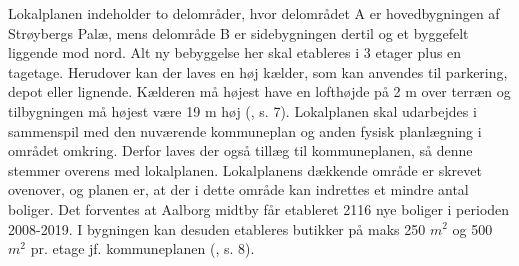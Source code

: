 \newline
\newline
Lokalplanen indeholder to delområder, hvor delområdet A er hovedbygningen af Strøybergs Palæ, mens delområde B er sidebygningen dertil og et byggefelt liggende mod nord. Alt ny bebyggelse her skal etableres i 3 etager plus en tagetage. Herudover kan der laves en høj kælder, som kan anvendes til parkering, depot eller lignende. Kælderen må højest have en lofthøjde på 2 m over terræn og tilbygningen må højest være 19 m høj (\citep{loaklplan}, s. 7).
\newline \indent{     }  Lokalplanen skal udarbejdes i sammenspil med den nuværende kommuneplan og anden fysisk planlægning i området omkring. Derfor laves der også tillæg til kommuneplanen, så denne stemmer overens med lokalplanen. Lokalplanens dækkende område er skrevet ovenover, og planen er, at der i dette område kan indrettes et mindre antal boliger. Det forventes at Aalborg midtby får etableret 2116 nye boliger i perioden 2008-2019. I bygningen kan desuden etableres butikker på maks 250 $m^2$  og 500 $m^2$ pr. etage jf. kommuneplanen (\citep{lokalplan}, s. 8).
\newline
\newline
